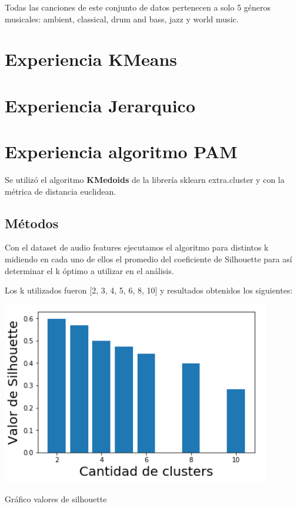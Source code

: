 \documentclass{icisfinal}
\begin{document}
Todas las canciones de este conjunto de datos pertenecen a solo 5 géneros musicales: ambient, classical, drum and bass, jazz y world music.

\newpage
\section{Experiencia KMeans}


\newpage
\section{Experiencia Jerarquico}


\newpage
\section{Experiencia algoritmo PAM}
Se utilizó el algoritmo \textbf{KMedoids} de la librería sklearn extra.cluster y con la métrica de distancia euclidean.
\subsection{Métodos}
Con el dataset de audio features ejecutamos el algoritmo para distintos k midiendo en cada uno de ellos el promedio del coeficiente de Silhouette para así determinar el k óptimo a utilizar en el análisis.

Los k utilizados fueron [2, 3, 4, 5, 6, 8, 10] y resultados obtenidos los siguientes:

\includegraphics[width=\textwidth]{img/imagenes/2PAM_silohuete_k}
\begin{center} Gráfico valores de silhouette \end{center}
\end{document}
